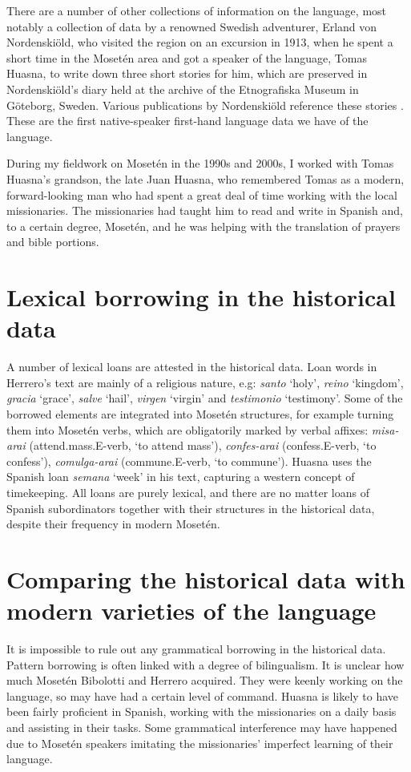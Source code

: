 \documentclass[output=paper,colorlinks,citecolor=brown
]{langscibook}
\begin{document}
There are a number of other collections of information on the language, most notably a collection of data by a renowned Swedish adventurer, Erland von Nordenskiöld, who visited the region on an excursion in 1913, when he spent a short time in the Mosetén area and got a speaker of the language, Tomas Huasna, to write down three short stories for him, which are preserved in Nordenskiöld's diary held at the archive of the Etnografiska Museum in Göteborg, Sweden. Various publications by Nordenskiöld reference these stories \citep{nordenskiold1924forschungen}. These are the first native-speaker first-hand language data we have of the language.

During my fieldwork on Mosetén in the 1990s and 2000s, I worked with Tomas Huasna’s grandson, the late Juan Huasna, who remembered Tomas as a modern, forward-looking man who had spent a great deal of time working with the local missionaries. The missionaries had taught him to read and write in Spanish and, to a certain degree, Mosetén, and he was helping with the translation of prayers and bible portions. 

\section{Lexical borrowing in the historical data}
A number of lexical loans are attested in the historical data. Loan words in Herrero's text are mainly of a religious nature, e.g: \textit{santo} ‘holy’, \textit{reino} ‘kingdom’, \textit{gracia} ‘grace’, \textit{salve} ‘hail’, \textit{virgen} ‘virgin’ and \textit{testimonio} ‘testimony’. Some of the borrowed elements are integrated into Mosetén structures, for example turning them into Mosetén verbs, which are obligatorily marked by verbal affixes: 
\textit{misa-arai} (attend.mass.E-verb, ‘to attend mass’), \textit{confes-arai} (confess.E-verb, ‘to confess’), \textit{comulga-arai} (commune.E-verb, ‘to commune’). Huasna uses the Spanish loan \textit{semana} ‘week’ in his text, capturing a western concept of timekeeping. All loans are purely lexical, and there are no matter loans of Spanish subordinators together with their structures in the historical data, despite their frequency in modern Mosetén. 

\section{Comparing the historical data with modern varieties of the language}
It is impossible to rule out any grammatical borrowing in the historical data. Pattern borrowing is often linked with a degree of bilingualism. It is unclear how much Mosetén Bibolotti and Herrero acquired. They were keenly working on the language, so may have had a certain level of command. Huasna is likely to have been fairly proficient in Spanish, working with the missionaries on a daily basis and assisting in their tasks. Some grammatical interference may have happened due to Mosetén speakers imitating the missionaries' imperfect learning of their language.
\end{document}
